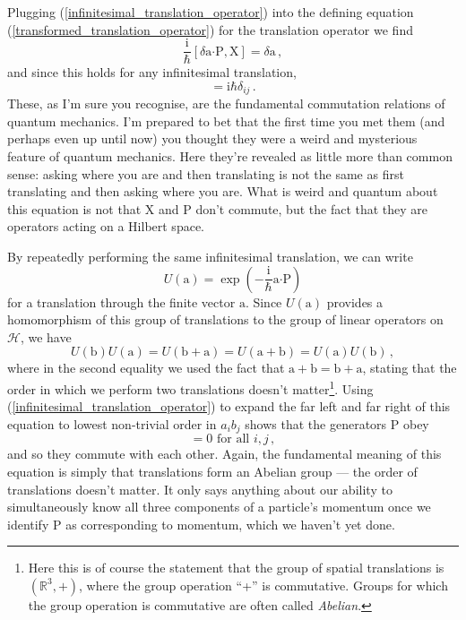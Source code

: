 \documentclass{article}
\theoremstyle{plain}\theoremheaderfont{\normalfont\itshape}\theorembodyfont{\rmfamily}\theoremseparator{.}\newtheorem*{rem}{Remark}\newtheorem*{ex}{Example}\newtheorem*{proof}{Proof}\newtheorem*{altp}{Alternative proof}
\theoremstyle{plain}\theoremheaderfont{\normalfont\bfseries}\theorembodyfont{\rmfamily}\theoremseparator{.}\newtheorem{thm}{Theorem}[section]\newtheorem{lem}[thm]{Lemma}\newtheorem{prop}[thm]{Proposition}\newtheorem*{cor}{Corollary}\newtheorem{defn}[thm]{Definition}\newtheorem{clm}[thm]{Claim}\newtheorem{clminproof}{Claim}
\theoremstyle{break}\theoremheaderfont{\normalfont\itshape}\theorembodyfont{\rmfamily}\theoremseparator{.\medskip}\newtheorem*{proofskip}{Proof}\newtheorem*{exs}{Examples}\newtheorem*{rems}{Remarks}
\theoremstyle{break}\theoremheaderfont{\normalfont\bfseries}\theorembodyfont{\rmfamily}\theoremseparator{.\medskip}\newtheorem{lemskip}[thm]{Lemma}\newtheorem{defnskip}[thm]{Definition}\newtheorem{propskip}[thm]{Proposition}\newtheorem{thmskip}[thm]{Theorem}
\numberwithin{equation}{section}
\newcommand{\ii}{\mathrm{i}}
\newcommand{\vb}[1]{\bm{\mathrm{#1}}}
\newcommand{\vdot}{\bm{\cdot}}
\newcommand{\hb}{\mathcal{H}}
\newcommand{\RR}{\mathbb{R}}
\begin{document}
    Plugging (\ref{infinitesimal_translation_operator}) into the defining equation (\ref{transformed_translation_operator}) for the translation operator we find
    \begin{equation}
        \frac{\ii}{\hbar}[\delta\vb{a}\vdot\vb{P},\vb{X}]=\delta\vb{a}\,,
    \end{equation}
    and since this holds for any infinitesimal translation,
    \begin{equation}
        [X_i,P_j]=\ii\hbar\delta_{ij}\,.
    \end{equation}
    These, as I'm sure you recognise, are the fundamental commutation relations of quantum mechanics. I'm prepared to bet that the first time you met them (and perhaps even up until now) you thought they were a weird and mysterious feature of quantum mechanics. Here they're revealed as little more than common sense: asking where you are and then translating is not the same as first translating and then asking where you are. What is weird and quantum about this equation is not that \(\vb{X}\) and \(\vb{P}\) don't commute, but the fact that they are operators acting on a Hilbert space.

    By repeatedly performing the same infinitesimal translation, we can write
    \begin{equation}
        U(\vb{a})=\exp\left(-\frac{\ii}{\hbar}\vb{a}\vdot\vb{P}\right)
    \end{equation}
    for a translation through the finite vector \(\vb{a}\). Since \(U(\vb{a})\) provides a homomorphism of this group of translations to the group of linear operators on \(\hb\), we have
    \begin{equation}
        U(\vb{b})U(\vb{a})=U(\vb{b}+\vb{a})=U(\vb{a}+\vb{b})=U(\vb{a})U(\vb{b})\,,
    \end{equation}
    where in the second equality we used the fact that \(\vb{a}+\vb{b}=\vb{b}+\vb{a}\), stating that the order in which we perform two translations doesn't matter\footnote{Here this is of course the statement that the group of spatial translations is \((\RR^3,+)\), where the group operation ``+'' is commutative. Groups for which the group operation is commutative are often called \textit{Abelian}.}. Using (\ref{infinitesimal_translation_operator}) to expand the far left and far right of this equation to lowest non-trivial order in \(a_ib_j\) shows that the generators \(\vb{P}\) obey
    \begin{equation}
        [P_i,P_j]=0\text{ for all }i,j\,,
    \end{equation}
    and so they commute with each other. Again, the fundamental meaning of this equation is simply that translations form an Abelian group --- the order of translations doesn't matter. It only says anything about our ability to simultaneously know all three components of a particle's momentum once we identify \(\vb{P}\) as corresponding to momentum, which we haven't yet done.
\end{document}
